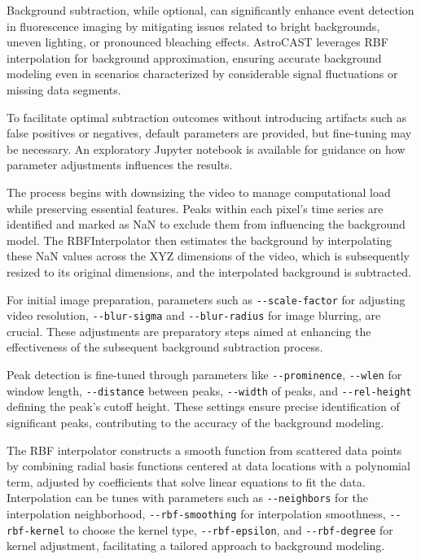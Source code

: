 Background subtraction, while optional, can significantly enhance event detection in fluorescence imaging by
mitigating issues related to bright backgrounds, uneven lighting, or pronounced bleaching effects. AstroCAST
leverages \ac{RBF} interpolation for background approximation, ensuring accurate background modeling even in
scenarios characterized by considerable signal fluctuations or missing data segments.

To facilitate optimal subtraction outcomes without introducing artifacts such as false positives or negatives,
default parameters are provided, but fine-tuning may be necessary. An exploratory Jupyter notebook is available\citep{noauthor_astrocastnotebooksdevexploring_deltaipynb_nodate} for guidance on how parameter adjustments influences the results.

The process begins with downsizing the video to manage computational load while preserving essential features. Peaks
within each pixel's time series are identified and marked as NaN to exclude them from influencing the background
model. The RBFInterpolator then estimates the background by interpolating these NaN values across the XYZ dimensions
of the video, which is subsequently resized to its original dimensions, and the interpolated background is subtracted.

For initial image preparation, parameters such as \lstinline[style=bashStyle]{--scale-factor} for adjusting video
resolution, \lstinline[style=bashStyle]{--blur-sigma} and \lstinline[style=bashStyle]{--blur-radius} for image
blurring, are crucial. These adjustments are preparatory steps aimed at enhancing the effectiveness of the subsequent
background subtraction process.

Peak detection is fine-tuned through parameters like \lstinline[style=bashStyle]{--prominence}, \lstinline[style=
bashStyle]{--wlen} for window length, \lstinline[style=bashStyle]{--distance} between peaks, \lstinline[style=
bashStyle]{--width} of peaks, and \lstinline[style=bashStyle]{--rel-height} defining the peak's cutoff height. These
settings ensure precise identification of significant peaks, contributing to the accuracy of the background modeling.

The RBF interpolator\citep{noauthor_scipyinterpolaterbfinterpolator_nodate} constructs a smooth function from
scattered data points by combining radial basis functions centered at data locations with a polynomial term, adjusted
by coefficients that solve linear equations to fit the data. Interpolation can be tunes with parameters such as \lstinline[style=bashStyle]{--neighbors} for the interpolation neighborhood, \lstinline[style=bashStyle]{--rbf-smoothing} for interpolation smoothness, \lstinline[style=bashStyle]{--rbf-kernel} to choose the kernel type, \lstinline[style=bashStyle]{--rbf-epsilon}, and \lstinline[style=bashStyle]{--rbf-degree} for kernel adjustment, facilitating a tailored approach to background modeling.

